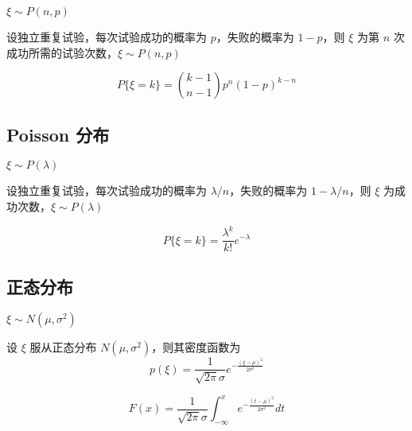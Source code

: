 \documentclass[12pt,a4paper]{amsart}
\begin{document}
$\xi\sim P(n,p)$

\begin{definition}[Pascal 分布]
    设独立重复试验，每次试验成功的概率为 $p$，失败的概率为 $1-p$，则 $\xi$ 为第 $n$ 次成功所需的试验次数，$\xi\sim P(n,p)$
\end{definition}

\begin{proposition}
    \begin{equation}
        P\{\xi=k\} = \binom{k-1}{n-1}p^n(1-p)^{k-n}
    \end{equation}
\end{proposition}

\subsection{Poisson 分布}

$\xi\sim P(\lambda)$

\begin{definition}[Poisson 分布]
    设独立重复试验，每次试验成功的概率为 $\lambda/n$，失败的概率为 $1-\lambda/n$，则 $\xi$ 为成功次数，$\xi\sim P(\lambda)$
\end{definition}

\begin{proposition}
    \begin{equation}
        P\{\xi=k\} = \frac{\lambda^k}{k!}e^{-\lambda}
    \end{equation}
\end{proposition}

\subsection{正态分布}

$\xi\sim N(\mu, \sigma^2)$

\begin{definition}[正态分布]
    设 $\xi$ 服从正态分布 $N(\mu, \sigma^2)$，则其密度函数为
    \begin{equation}
        p(\xi) = \frac{1}{\sqrt{2\pi}\sigma}e^{-\frac{(\xi-\mu)^2}{2\sigma^2}}
    \end{equation}
\end{definition}

\begin{proposition}[正态分布的分布函数]
    \begin{equation}
        F(x) = \frac{1}{\sqrt{2\pi}\sigma}\int_{-\infty}^{x}e^{-\frac{(t-\mu)^2}{2\sigma^2}}dt
    \end{equation}
\end{proposition}
\end{document}
